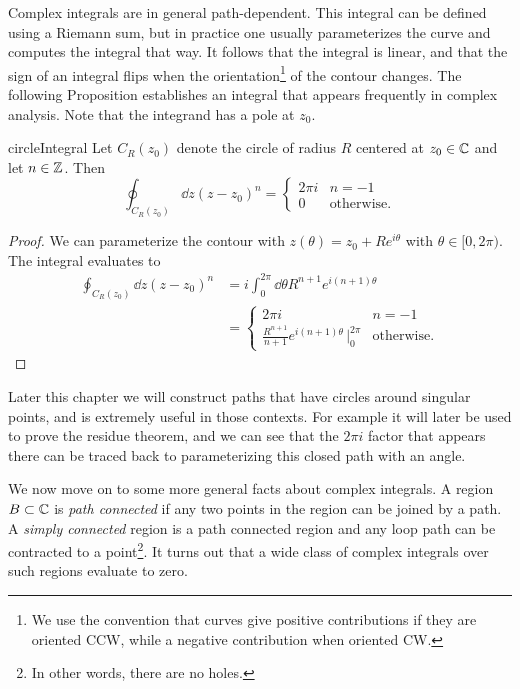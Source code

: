 Complex integrals are in general path-dependent.
This integral can be defined using a Riemann sum, but in practice one usually
parameterizes the curve and computes the integral that way.
It follows that the integral is linear, and that the sign of an integral
flips when the orientation\footnote{We use the convention
that curves give positive contributions if they are oriented CCW, while a
negative contribution when oriented CW.} of the contour changes.
The following Proposition establishes an integral that appears frequently
in complex analysis. Note that the integrand has a pole at $z_0$.
\begin{proposition}{}{circleIntegral}
Let $C_R(z_0)$ denote the circle of radius $R$ centered at $z_0\in\mathbb{C}$
and let $n\in\mathbb{Z}$. Then
$$
\oint_{C_R(z_0)}\dd{z}(z-z_0)^n=
\begin{cases}
 2\pi i & n=-1\\
 0      & \text{otherwise}.
\end{cases}
$$
\begin{proof}
We can parameterize the contour with $z(\theta)=z_0+Re^{i\theta}$
with $\theta\in[0,2\pi)$. The integral evaluates to
\begin{equation*}\begin{aligned}
\oint_{C_R(z_0)}\dd{z}(z-z_0)^n&=
i\int_0^{2\pi}\dd{\theta} R^{n+1}e^{i(n+1)\theta}\\
&=
\begin{cases}
 2\pi i & n=-1\\
 \frac{R^{n+1}}{n+1}e^{i(n+1)\theta}\,\big|_0^{2\pi} & \text{otherwise}. 
\end{cases}
\end{aligned}\end{equation*}
\end{proof}
\end{proposition}

Later this chapter we will construct paths that have circles around singular
points, and  is extremely useful in those contexts.
For example it will later be used to prove the residue 
theorem, and we can see that the $2\pi i$ factor that appears there can be traced
back to parameterizing this closed path with an angle.  

We now move on to some more general facts about complex integrals.
A region $B\subset\mathbb{C}$ is {\it path connected} if any two points in the region
can be joined by a path. A {\it simply connected} region is a path connected
region and any loop path can be contracted to a point\footnote{In other words,
there are no holes.}. It turns out that a wide class of complex integrals
over such regions evaluate to zero.

